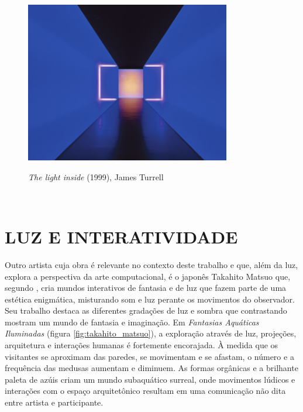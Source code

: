\begin{figure}[H]
    \centering
    \caption{\textit{The light inside} (1999), James Turrell}
	\vspace*{0,2cm}
    \includegraphics[width=0.8\textwidth]{./04-figuras/james_turrell}
    \label{fig:james_turrell}
\end{figure}
\vspace*{-0,9cm}
{\raggedright {}}\\

\section{LUZ E INTERATIVIDADE}

Outro artista cuja obra é relevante no contexto deste trabalho e que, além da luz, explora a perspectiva da arte computacional, é o japonês Takahito Matsuo que, segundo , cria mundos interativos de fantasia e de luz que fazem parte de uma estética enigmática, misturando som e luz perante os movimentos do observador. Seu trabalho destaca as diferentes gradações de luz e sombra que contrastando mostram um mundo de fantasia e imaginação. Em \textit{Fantasias Aquáticas Iluminadas} (figura \ref{fig:takahito_matsuo}), a exploração através de luz, projeções, arquitetura e interações humanas é fortemente encorajada. À medida que os visitantes se aproximam das paredes, se movimentam e se afastam, o número e a frequência das medusas aumentam e diminuem. As formas orgânicas e a brilhante paleta de azúis criam um mundo subaquático surreal, onde movimentos lúdicos e interações com o espaço arquitetônico resultam em uma comunicação não dita entre artista e participante. 

